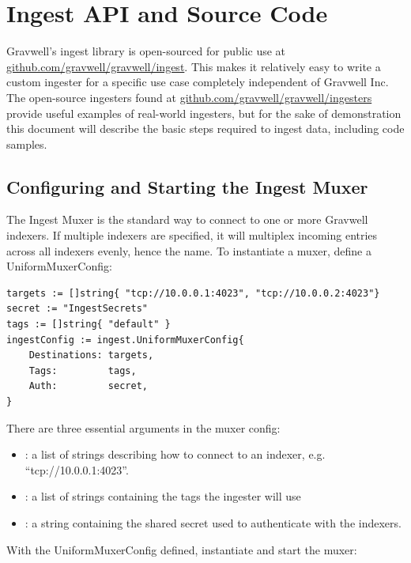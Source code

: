 \clearpage

\section{Ingest API and Source Code}
Gravwell's ingest library is open-sourced for public use at
\href{github.com/gravwell/gravwell/tree/master/ingest}{github.com/gravwell/gravwell/ingest}.
This makes it relatively easy to write a custom ingester for a specific
use case completely independent of Gravwell Inc. The open-source
ingesters found at
\href{github.com/gravwell/gravwell/tree/master/ingesters}{github.com/gravwell/gravwell/ingesters} provide
useful examples of real-world ingesters, but for the sake of
demonstration this document will describe the basic steps required to
ingest data, including code samples.

\subsection{Configuring and Starting the Ingest Muxer}

The Ingest Muxer is the standard way to connect to one or more Gravwell
indexers. If multiple indexers are specified, it will multiplex incoming
entries across all indexers evenly, hence the name. To instantiate a
muxer, define a UniformMuxerConfig:

\begin{Verbatim}[breaklines=true]
targets := []string{ "tcp://10.0.0.1:4023", "tcp://10.0.0.2:4023"}
secret := "IngestSecrets"
tags := []string{ "default" }
ingestConfig := ingest.UniformMuxerConfig{
    Destinations: targets,
    Tags:         tags,
    Auth:         secret,
}
\end{Verbatim}

There are three essential arguments in the muxer config:

\begin{itemize}
\item
  : a list of strings describing how to connect to an
  indexer, e.g. ``tcp://10.0.0.1:4023''.
\item
  : a list of strings containing the tags the ingester will use
\item
  : a string containing the shared secret used to authenticate with
  the indexers.
\end{itemize}

With the UniformMuxerConfig defined, instantiate and start the muxer:

